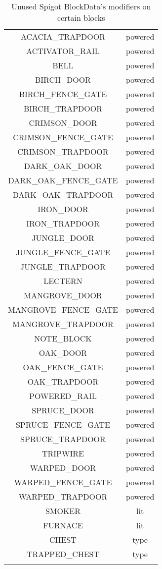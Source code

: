 \begin{longtable}{ |c|c| }
	ACACIA\_TRAPDOOR & powered \\
	ACTIVATOR\_RAIL & powered \\
	BELL & powered \\
	BIRCH\_DOOR & powered \\
	BIRCH\_FENCE\_GATE & powered \\
	BIRCH\_TRAPDOOR & powered \\
	CRIMSON\_DOOR & powered \\
	CRIMSON\_FENCE\_GATE & powered \\
	CRIMSON\_TRAPDOOR & powered \\
	DARK\_OAK\_DOOR & powered \\
	DARK\_OAK\_FENCE\_GATE & powered \\
	DARK\_OAK\_TRAPDOOR & powered \\
	IRON\_DOOR & powered \\
	IRON\_TRAPDOOR & powered \\
	JUNGLE\_DOOR & powered \\
	JUNGLE\_FENCE\_GATE & powered \\
	JUNGLE\_TRAPDOOR & powered \\
	LECTERN & powered \\
	MANGROVE\_DOOR & powered \\
	MANGROVE\_FENCE\_GATE & powered \\
	MANGROVE\_TRAPDOOR & powered \\
	NOTE\_BLOCK & powered \\
	OAK\_DOOR & powered \\
	OAK\_FENCE\_GATE & powered \\
	OAK\_TRAPDOOR & powered \\
	POWERED\_RAIL & powered \\
	SPRUCE\_DOOR & powered \\
	SPRUCE\_FENCE\_GATE & powered \\
	SPRUCE\_TRAPDOOR & powered \\
	TRIPWIRE & powered \\
	WARPED\_DOOR & powered \\
	WARPED\_FENCE\_GATE & powered \\
	WARPED\_TRAPDOOR & powered \\
	\hline
	SMOKER & lit \\
	FURNACE & lit \\
	\hline
	CHEST & type \\
	TRAPPED\_CHEST & type \\
	\hline
	
	\caption{Unused Spigot BlockData's modifiers on certain blocks}
	\label{fig:unused-blockdata-blocks}
\end{longtable}

